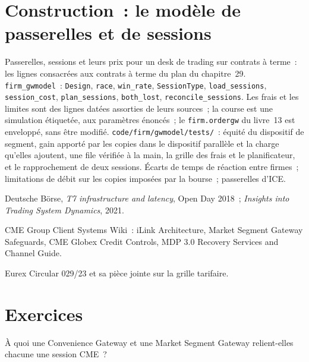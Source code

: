 \section{Construction~: le modèle de passerelles et de sessions}\label{bld:nw:futures-connectivity:gwmodel}

\begin{build}
 Passerelles, sessions et leurs prix pour un desk de trading sur contrats à terme~: les lignes consacrées aux contrats à terme du plan du chapitre~29.
 \texttt{firm\_gwmodel}~: \texttt{Design}, \texttt{race}, \texttt{win\_rate}, \texttt{SessionType},
\texttt{load\_sessions}, \texttt{session\_cost}, \texttt{plan\_sessions}, \texttt{both\_lost}, \texttt{reconcile\_sessions}.
 Les frais et les limites sont des lignes datées assorties de leurs sources~; la course est une simulation étiquetée, aux paramètres énoncés~; le
\texttt{firm.ordergw} du livre~13 est enveloppé, sans être modifié.
 \texttt{code/firm/gwmodel/tests/}~: équité du dispositif de segment, gain apporté par les copies dans le dispositif parallèle
et la charge qu'elles ajoutent, une file vérifiée à la main, la grille des frais et le planificateur, et le rapprochement de deux sessions.
 Écarts de temps de réaction entre firmes~; limitations de débit sur les copies imposées par la bourse~; passerelles d'ICE.
\end{build}

\begin{omsources}
\item Deutsche Börse, \emph{T7 infrastructure and latency}, Open Day 2018~; \emph{Insights into Trading System Dynamics}, 2021.
\item CME Group Client Systems Wiki~: iLink Architecture, Market Segment Gateway Safeguards, CME Globex Credit Controls, MDP 3.0
  Recovery Services and Channel Guide.
\item Eurex Circular 029/23 et sa pièce jointe sur la grille tarifaire.
\end{omsources}

\section{Exercices}

\begin{exercise}[$\star$]\label{exo:nw:futures-connectivity:1}
À quoi une Convenience Gateway et une Market Segment Gateway relient-elles chacune une session CME~?
\end{exercise}

